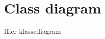 \newpage
\appendix
\appendixpage

\section{Class diagram} \label{app:classDiagram}

Hier klassediagram